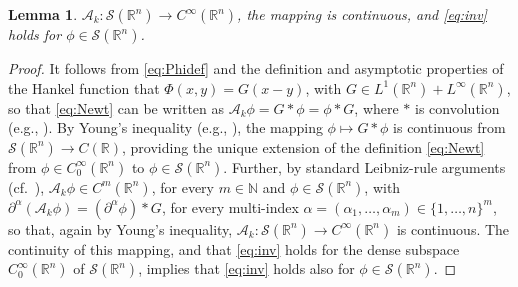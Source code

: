 \documentclass{birkjour}
\newtheorem{lemma}[theorem]{Lemma}
\theoremstyle{definition}
\theoremstyle{remark}
\numberwithin{equation}{section}
\newcommand{\R}{\mathbb{R}}
\newcommand{\N}{\mathbb{N}}
\newcommand{\cS}{\mathcal{S}}
\newcommand{\cA}{\mathcal{A}}
\begin{document}
\begin{lemma} \label{lem:map}
 $\cA_k:\cS(\R^n)\to C^\infty(\R^n)$, the mapping is continuous, and \eqref{eq:inv} holds for $\phi\in \cS(\R^n)$. 
\end{lemma}
\begin{proof} It follows from \eqref{eq:Phidef} and the definition  and asymptotic properties of the Hankel function \cite[(10.2.2)-(10.2.5)]{NIST} that $\Phi(x,y)=G(x-y)$, with $G\in L^1(\R^n)+L^\infty(\R^n)$, so that \eqref{eq:Newt} can be written as $\cA_k\phi = G*\phi=\phi*G$, where $*$ is convolution (e.g., \cite[p.~58]{mclean2000strongly}). By  Young's inequality (e.g., \cite[Thm.~3.2 and its proof]{mclean2000strongly}), the mapping $\phi\mapsto G*\phi$ is continuous from $\cS(\R^n)\to C(\R)$, providing the unique extension of the definition \eqref{eq:Newt} from $\phi\in C_0^\infty(\R^n)$ to $\phi\in \cS(\R^n)$. Further, by standard Leibniz-rule arguments (cf.~\cite[Thm.~3.3]{mclean2000strongly}), $\cA_k\phi\in C^m(\R^n)$, for every $m\in \N$ and $\phi\in \cS(\R^n)$, with $\partial^\alpha(\cA_k\phi) = (\partial^\alpha \phi)*G$, for every multi-index $\alpha=(\alpha_1,\ldots,\alpha_m)\in \{1,\ldots,n\}^m$, so that, again by Young's inequality, $\cA_k:\cS(\R^n)\to C^\infty(\R^n)$ is continuous. The continuity of this mapping, and that \eqref{eq:inv} holds for the dense subspace $C_0^\infty(\R^n)$ of $\cS(\R^n)$, implies that \eqref{eq:inv} holds also for $\phi\in \cS(\R^n)$.
\end{proof}
\end{document}
